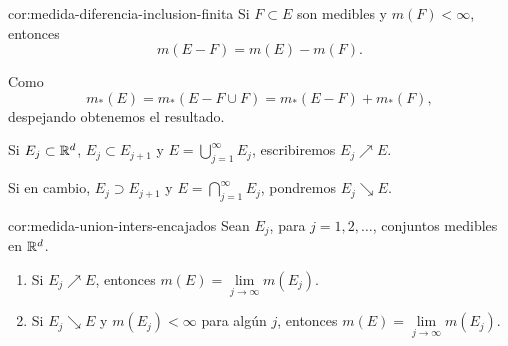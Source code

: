 \begin{corolario}{cor:medida-diferencia-inclusion-finita}
Si $F\subset E$ son medibles y $m(F)<\infty$, entonces 
\[
m(E-F)=m(E)-m(F).
\]
\end{corolario}


\begin{demo}
 Como 
 \[
  m_*(E)=m_*(E-F\cup F)=m_*(E-F)+m_*(F),
 \]
despejando obtenemos el resultado.
\end{demo}



\begin{definicion}{}
Si $E_j\subset \mathbb{R}^d$, $E_j\subset E_{j+1}$ y $E=\bigcup\limits_{j=1}^{\infty} E_j$, escribiremos $E_j \nearrow E$.

Si en cambio, $E_j\supset E_{j+1}$ y $E=\bigcap\limits_{j=1}^{\infty} E_j$, pondremos $E_j \searrow E$.
\end{definicion}

\begin{corolario}{cor:medida-union-inters-encajados}
Sean $E_j$, para $j=1,2,\ldots$, conjuntos medibles en $\mathbb{R}^d$. 
\begin{enumerate}
    \item \label{it:medida-union-encajados} Si $E_j\nearrow E$, entonces $m(E)=\lim\limits_{j \to \infty} m(E_j)$.
    \item \label{it:medida-interseccion-encajados} Si $E_j \searrow E$ y $m(E_j)<\infty$ para alg\'un $j$, entonces $m(E)=\lim\limits_{j \to \infty} m(E_j)$.
\end{enumerate}
\end{corolario}



